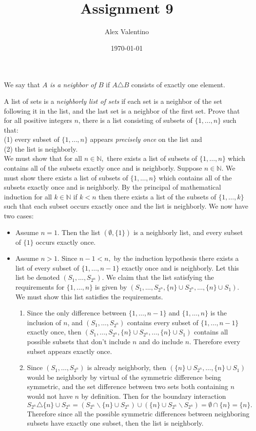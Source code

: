 \documentclass[12pt, letterpaper]{article}
\date{\today}
\author{Alex Valentino}
\title{Assignment 9}
\newcommand{\N}{\mathbb{N}}
\begin{document}
We say that {\em $A$ is a neighbor
of $B$} 
if $A \triangle B$ consists of exactly one element. 

A list of sets is a {\em neighborly list of sets}
if each  set is a neighbor of the set following it in the list,
and the last set is a neighbor of the first set.   Prove that 
for all positive integers
$n$, there is a list  consisting  of subsets of
$\{1,\ldots, n\}$ such that:\\
(1) every subset of $\{1,\ldots,n\}$ 
appears {\em precisely
once} on the list and \\
(2) the list is neighborly.\\
We must show that for all $n \in \N,$ there exists a list of subsets of $\{1,\ldots,n\}$ which contains all of the subsets exactly once and is neighborly.  Suppose $n \in \N.$  We must show there exists a list of subsets of $\{1,\ldots,n\}$ which contains all of the subsets exactly once and is neighborly.  By the principal of mathematical induction for all $k \in \N$ if $k<n$ then there exists a list of the subsets of $\{1,\ldots,k\}$ such that each subset occurs exactly once and the list is neighborly.  We now have two cases:
\begin{itemize}
	\item Assume $n=1$.  Then the list $(\emptyset, \{1\})$ is a neighborly list, and every subset of $\{1\}$ occurs exactly once.  
	\item Assume $n>1$.  Since $n-1 < n,$ by the induction hypothesis there exists a list of every subset of $\{1,\ldots, n-1\}$ exactly once and is neighborly.  Let this list be denoted $(S_1,\ldots,S_{2^n})$.
	We claim that the list satisfying the requirements for $\{1,\ldots,n\}$ is given by $(S_1,\ldots,S_{2^n},\{n\} \cup S_{2^n},\ldots, \{n\} \cup S_{1})$.  We must show this list satisfies the requirements.
	\begin{enumerate}
	\item Since the only difference between $\{1,\ldots, n-1\}$ and $\{1,\ldots, n\}$ is the inclusion of $n$, and $(S_1,\ldots, S_{2^n})$ contains every subset of $\{1,\ldots,n-1\}$ exactly once, then $(S_1,\ldots,S_{2^n},\{n\} \cup S_{2^n},\ldots, \{n\} \cup S_{1})$ contains all possible subsets that don't include $n$ and do include $n$.  Therefore every subset appears exactly once.
	\item Since $(S_1,\ldots,S_{2^n})$ is already neighborly, then $(\{n\} \cup S_{2^n},\ldots, \{n\} \cup S_{1})$ would be neighborly by virtual of the symmetric difference being symmetric, and the set difference between two sets both containing $n$ would not have $n$ by definition.  Then for the boundary interaction $ S_{2^n} \triangle \{n\} \cup S_{2^n} =(S_{2^n} \backslash \{n\} \cup S_{2^n}) \cup (\{n\} \cup S_{2^n} \backslash  S_{2^n}) = \emptyset \cap \{n\} = \{n\}.$  Therefore since all the possible symmetric differences between neighboring subsets have exactly one subset, then the list is neighborly.
	\end{enumerate}
\end{itemize}
\end{document}
